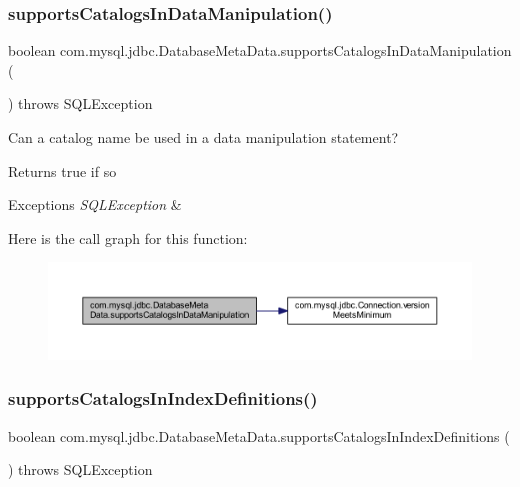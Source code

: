 \subsubsection{\texorpdfstring{supports\+Catalogs\+In\+Data\+Manipulation()}{supportsCatalogsInDataManipulation()}}
{\footnotesize\ttfamily boolean com.\+mysql.\+jdbc.\+Database\+Meta\+Data.\+supports\+Catalogs\+In\+Data\+Manipulation (\begin{DoxyParamCaption}{ }\end{DoxyParamCaption}) throws S\+Q\+L\+Exception}

Can a catalog name be used in a data manipulation statement?

\begin{DoxyReturn}{Returns}
true if so 
\end{DoxyReturn}

\begin{DoxyExceptions}{Exceptions}
{\em S\+Q\+L\+Exception} & \\
\hline
\end{DoxyExceptions}
Here is the call graph for this function\+:
\nopagebreak
\begin{figure}[H]
\begin{center}
\leavevmode
\includegraphics[width=350pt]{classcom_1_1mysql_1_1jdbc_1_1_database_meta_data_ab0f33acafccde86fefbc639b0a8a50ae_cgraph}
\end{center}
\end{figure}
\mbox{\label{classcom_1_1mysql_1_1jdbc_1_1_database_meta_data_a2a6676d40a055f69965fae7c3767cc9d}} 
\subsubsection{\texorpdfstring{supports\+Catalogs\+In\+Index\+Definitions()}{supportsCatalogsInIndexDefinitions()}}
{\footnotesize\ttfamily boolean com.\+mysql.\+jdbc.\+Database\+Meta\+Data.\+supports\+Catalogs\+In\+Index\+Definitions (\begin{DoxyParamCaption}{ }\end{DoxyParamCaption}) throws S\+Q\+L\+Exception}

